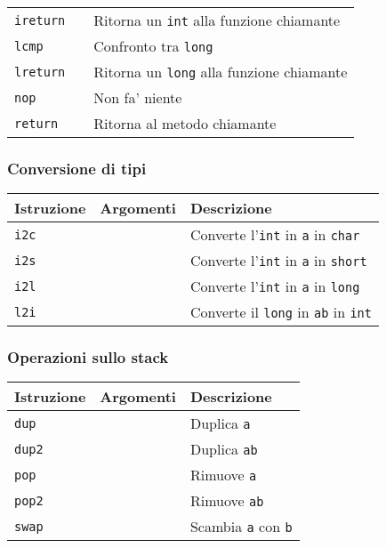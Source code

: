 {\begin{longtable}{p{2cm} p{2cm} p{6.5cm}}
  \texttt{ireturn} &
  &
  Ritorna un \texttt{int} alla funzione chiamante \\
  
  \texttt{lcmp} &
  &
  Confronto tra \texttt{long} \\
  
  \texttt{lreturn} &
  &
  Ritorna un \texttt{long} alla funzione chiamante \\
  
  \texttt{nop} &
  &
  Non fa' niente \\
  
  \texttt{return} &
  &
  Ritorna al metodo chiamante \\
\bottomrule
\end{longtable}
} %

\subsubsection*{Conversione di tipi}
\label{sec:conversione_di_tipi}
{\footnotesize
\begin{longtable}{p{2cm} p{2cm} p{6.5cm}}
\toprule
\rowcolor[gray]{0.9}
  \textbf{Istruzione} &
  \textbf{Argomenti} &
  \textbf{Descrizione} \\
\toprule
\endhead
  \texttt{i2c} &
  &
  Converte l'\texttt{int} in \texttt{a} in \texttt{char} \\

  \texttt{i2s} &
  &
  Converte l'\texttt{int} in \texttt{a} in \texttt{short} \\
  
  \texttt{i2l} &
  &
  Converte l'\texttt{int} in \texttt{a} in \texttt{long} \\
  
  \texttt{l2i} &
  &
  Converte il \texttt{long} in \texttt{ab} in \texttt{int} \\
\bottomrule
\end{longtable}
} %

\subsubsection*{Operazioni sullo stack}
\label{sec:operazioni_sullo_stack}
{\footnotesize
\begin{longtable}{p{2cm} p{2cm} p{6.5cm}}
\toprule
\rowcolor[gray]{0.9}
  \textbf{Istruzione} &
  \textbf{Argomenti} &
  \textbf{Descrizione} \\
\toprule
\endhead
  \texttt{dup} &
  &
  Duplica \texttt{a} \\

  \texttt{dup2} &
  &
  Duplica \texttt{ab} \\
  
  \texttt{pop} &
  &
  Rimuove \texttt{a} \\
  
  \texttt{pop2} &
  &
  Rimuove \texttt{ab} \\
  
  \texttt{swap} &
  &
  Scambia \texttt{a} con \texttt{b} \\
\bottomrule
\end{longtable}
} %

